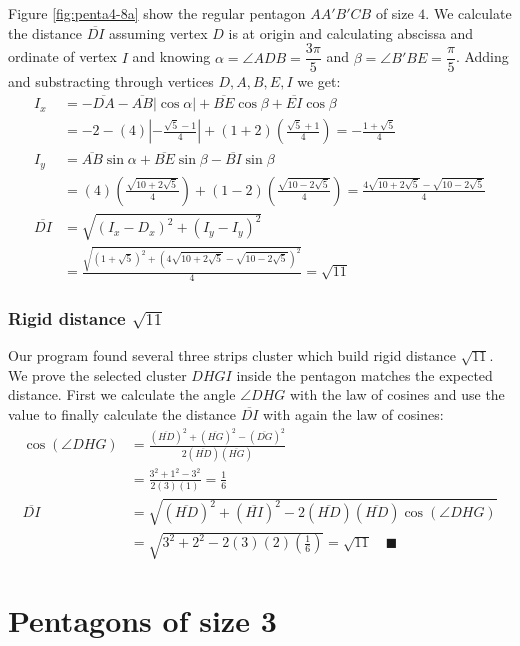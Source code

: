\documentclass[11pt]{article}
\begin{document}
Figure \ref{fig:penta4-8a} show the regular pentagon $AA'B'CB$ of size $4$. We calculate the distance $\overline{DI}$ assuming vertex $D$ is at origin and calculating abscissa and ordinate of vertex $I$ and knowing $\alpha = \angle{ADB} = \dfrac{3\pi}5$ and $\beta = \angle{B'BE} = \dfrac{\pi}5$. Adding and substracting through vertices $D,A,B,E,I$ we get:
\begin{align}
I_x &= -\overline{DA} - \overline{AB}|\cos\alpha| + \overline{BE}\cos\beta + \overline{EI}\cos\beta \nonumber\\
 &= -2 -(4)\left|-\frac{\sqrt5 - 1}4\right| + (1+2)\left(\frac{\sqrt5+1}4\right)
 = -\frac{1+\sqrt5}4 \\
I_y &= \overline{AB}\sin\alpha + \overline{BE}\sin\beta - \overline{BI}\sin\beta \nonumber\\
 &= (4)\left(\frac{\sqrt{10+2\sqrt5}}4\right) + (1-2)\left(\frac{\sqrt{10-2\sqrt5}}4\right)
 = \frac{4\sqrt{10+2\sqrt5} - \sqrt{10-2\sqrt5}}4 \\
%
\overline{DI} &= \sqrt{(I_x - D_x)^2 + (I_y - I_y)^2} \nonumber\\
 &= \frac{\sqrt{(1+\sqrt5)^2 + (4\sqrt{10+2\sqrt5} - \sqrt{10-2\sqrt5})^2}}4
 = \sqrt{11}
\end{align}

\subsubsection{Rigid distance $\sqrt{11}$}

Our program found several three strips cluster which build rigid distance $\sqrt{11}$. We prove the selected cluster $DHGI$ inside the pentagon matches the expected distance. First we calculate the angle $\angle{DHG}$ with the law of cosines and use the value to finally calculate the distance $\overline{DI}$ with again the law of cosines:
\begin{align}
\cos(\angle{DHG}) &= \frac{(\overline{HD})^2 + (\overline{HG})^2 - (\overline{DG})^2}
 {2(\overline{HD})(\overline{HG})} \nonumber\\
 &= \frac{3^2 + 1^2 - 3^2}{2(3)(1)} = \frac{1}6 \\
\overline{DI} &= \sqrt{(\overline{HD})^2 + (\overline{HI})^2
 - 2(\overline{HD})(\overline{HD})\cos(\angle{DHG})} \nonumber\\
 &= \sqrt{3^2 + 2^2 - 2(3)(2)\left(\frac{1}6\right)} = \sqrt{11} \quad\blacksquare
\end{align}

\section{Pentagons of size 3}
\end{document}
